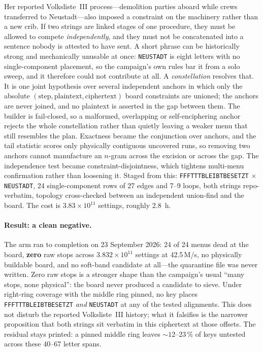 \documentclass[11pt,a4paper]{article}
\begin{document}
Her reported Volksliste~III process---demolition parties aboard while crews transferred to
Neustadt---also imposed a constraint on the machinery rather than a new crib. If two strings are
linked stages of one procedure, they must be allowed to compete \emph{independently}, and they
must not be concatenated into a sentence nobody is attested to have sent. A short phrase can be
historically strong and mechanically unusable at once: \texttt{NEUSTADT} is eight letters with no
single-component placement, so the campaign's own rules bar it from a solo sweep, and it therefore
could not contribute at all.
A \emph{constellation} resolves that. It is one joint hypothesis over several independent anchors
in which only the absolute $(\text{step},\text{plaintext},\text{ciphertext})$ board constraints are
unioned; the anchors are never joined, and no plaintext is asserted in the gap between them. The
builder is fail-closed, so a malformed, overlapping or self-enciphering anchor rejects the whole
constellation rather than quietly leaving a weaker menu that still resembles the plan. Exactness
became the conjunction over anchors, and the tail statistic scores only physically contiguous
uncovered runs, so removing two anchors cannot manufacture an $n$-gram across the excision or
across the gap. The independence test became constraint-disjointness, which tightens multi-menu
confirmation rather than loosening it.
Staged from this: \texttt{FFFTTTBLEIBTBESETZT} $\times$ \texttt{NEUSTADT}, 24 single-component
rows of 27 edges and 7--9 loops, both strings repo-verbatim, topology cross-checked between an
independent union-find and the board. The cost is $3.83\times10^{11}$ settings, roughly 2.8~h.

\paragraph{Result: a clean negative.}
The arm ran to completion on 23 September 2026: 24 of 24 menus dead at the board,
\textbf{zero} raw stops across $3.832\times10^{11}$ settings at 42.5\,M/s, no physically
buildable board, and no soft-band candidate at all---the quarantine file was never written.
Zero raw stops is a stronger shape than the campaign's usual ``many stops, none physical'':
the board never produced a candidate to sieve. Under right-ring coverage with the middle ring
pinned, no key places \texttt{FFFTTTBLEIBTBESETZT} \emph{and} \texttt{NEUSTADT} at any of the
tested alignments. This does not disturb the reported Volksliste~III history; what it falsifies
is the narrower proposition that both strings sit verbatim in this ciphertext at those offsets.
The residual stays printed: a pinned middle ring leaves ${\sim}12$--$23\,\%$ of keys untested
across these 40--67 letter spans.
\end{document}

